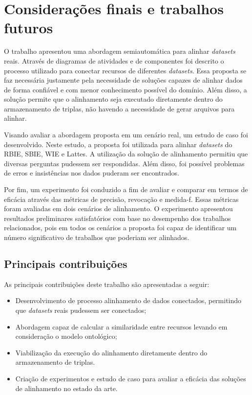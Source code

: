 \chapter{Considerações finais e trabalhos futuros}

O trabalho apresentou uma abordagem semiautomática para alinhar \textit{datasets} reais. Através de diagramas de atividades e de componentes foi descrito o processo utilizado para conectar recursos de diferentes \textit{datasets}. Essa proposta se faz necessária justamente pela necessidade de soluções capazes de alinhar dados de forma confiável e com menor conhecimento possível do domínio. Além disso, a solução permite que o alinhamento seja executado diretamente dentro do armazenamento de triplas, não havendo a necessidade de gerar arquivos para alinhar. 

Visando avaliar a abordagem proposta em um cenário real, um estudo de caso foi desenvolvido. Neste estudo, a proposta foi utilizada para alinhar \textit{datasets} do RBIE, SBIE, WIE e Lattes. A utilização da solução de alinhamento permitiu que diversas perguntas pudessem ser respondidas. Além disso, foi possível problemas de erros e insistências nos dados puderam ser encontrados.

Por fim, um experimento foi conduzido  a fim de avaliar e comparar em termos de eficácia através das métricas de precisão, revocação e medida-f. Essas métricas foram avaliadas em dois cenários de alinhamento. O experimento apresentou resultados preliminares satisfatórios com base no desempenho dos trabalhos relacionados, pois em todos os cenários a proposta foi capaz de identificar um número significativo de trabalhos que poderiam ser alinhados. 

\section{Principais contribuições}
As principais contribuições deste trabalho são apresentadas a seguir:
\begin{itemize}
\item Desenvolvimento de processo alinhamento de dados conectados, permitindo que \textit{datasets} reais pudessem ser conectados;
\item Abordagem capaz de calcular a similaridade entre recursos levando em consideração o modelo ontológico;
\item Viabilização da execução do alinhamento diretamente dentro do armazenamento de triplas.
\item  Criação de experimentos e estudo de caso para avaliar a eficácia das soluções de alinhamento no estado da arte.
\end{itemize}


